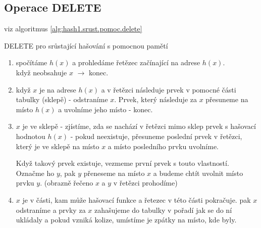 \subsection{Operace DELETE}

viz algoritmus \ref{alg:hash1.srust.pomoc.delete}

\begin{algorithm}[!htb]
\caption{DELETE pro srůstající hašování s pomocnou pamětí}
\label{alg:hash1.srust.pomoc.delete}
\begin{enumerate}
\item spočítáme $h(x)$ a prohledáme řetězec začínající na adrese $h(x)$. \\
když neobsahuje $x$ $\rightarrow$ konec.
\item když $x$ je na adrese $h(x)$ a v řetězci následuje prvek v pomocné části
tabulky (sklepě) - odstraníme $x$. Prvek, který následuje za $x$ přesuneme 
na místo $h(x)$ a uvolníme jeho místo - konec.
\item $x$ je ve sklepě - zjístíme, zda se nachází v řetězci mimo sklep prvek
s hašovací hodnotou $h(x)$ - pokud neexistuje, přesuneme poslední prvek v
řetězci, který je ve sklepě na místo $x$ a místo posledního prvku uvolníme.
\par
Když takový prvek existuje, vezmeme první prvek s touto vlastností.
Označme ho $y$, pak $y$ přeneseme na místo $x$ a budeme chtít uvolnit místo
prvku $y$. (obrazně řečeno $x$ a $y$ v řetězci prohodíme)
\item $x$ je v části, kam může hašovací funkce a řetezec v této části
pokračuje. pak $x$ odstraníme a prvky za $x$ zahašujeme do tabulky v pořadí
jak se do ní ukládaly a pokud vzniká kolize, umístíme je zpátky na místo,
kde byly.
\end{enumerate}
\end{algorithm}

\pagebreak

